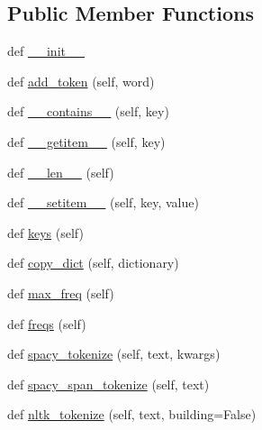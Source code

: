 \subsection*{Public Member Functions}
\begin{DoxyCompactItemize}
\item 
def \hyperlink{classparlai_1_1core_1_1dict_1_1DictionaryAgent_a178d2fa022c5858a23c785f615f831b1}{\+\_\+\+\_\+init\+\_\+\+\_\+}
\item 
def \hyperlink{classparlai_1_1core_1_1dict_1_1DictionaryAgent_aec44508e4b501214618e24d86a4a51df}{add\+\_\+token} (self, word)
\item 
def \hyperlink{classparlai_1_1core_1_1dict_1_1DictionaryAgent_a29f4181dcdd5f53103bc342bf5f3c74a}{\+\_\+\+\_\+contains\+\_\+\+\_\+} (self, key)
\item 
def \hyperlink{classparlai_1_1core_1_1dict_1_1DictionaryAgent_a82a64989f1750412b6ffd9a4270953b3}{\+\_\+\+\_\+getitem\+\_\+\+\_\+} (self, key)
\item 
def \hyperlink{classparlai_1_1core_1_1dict_1_1DictionaryAgent_a1c686bb8b03cf09dbd43943d268c2410}{\+\_\+\+\_\+len\+\_\+\+\_\+} (self)
\item 
def \hyperlink{classparlai_1_1core_1_1dict_1_1DictionaryAgent_a43dfd6220ded966731b62bca37333dec}{\+\_\+\+\_\+setitem\+\_\+\+\_\+} (self, key, value)
\item 
def \hyperlink{classparlai_1_1core_1_1dict_1_1DictionaryAgent_ad5abcf174648d88f2383cba7a361dd29}{keys} (self)
\item 
def \hyperlink{classparlai_1_1core_1_1dict_1_1DictionaryAgent_a84faa359351d8b3edfb333e3b5f5ed71}{copy\+\_\+dict} (self, dictionary)
\item 
def \hyperlink{classparlai_1_1core_1_1dict_1_1DictionaryAgent_a3c3ef6181e0cea58b2650af763db1d17}{max\+\_\+freq} (self)
\item 
def \hyperlink{classparlai_1_1core_1_1dict_1_1DictionaryAgent_a72cfec62b2d5117326f514edfe848a1e}{freqs} (self)
\item 
def \hyperlink{classparlai_1_1core_1_1dict_1_1DictionaryAgent_a8e818ad5e11ecb08de6c4b858b2e68f1}{spacy\+\_\+tokenize} (self, text, kwargs)
\item 
def \hyperlink{classparlai_1_1core_1_1dict_1_1DictionaryAgent_a6532e92a69be5a68d04963597cd4ba29}{spacy\+\_\+span\+\_\+tokenize} (self, text)
\item 
def \hyperlink{classparlai_1_1core_1_1dict_1_1DictionaryAgent_a73fe72e257ace6e8debf2c41995f8390}{nltk\+\_\+tokenize} (self, text, building=False)
\item 

\end{DoxyCompactItemize}
